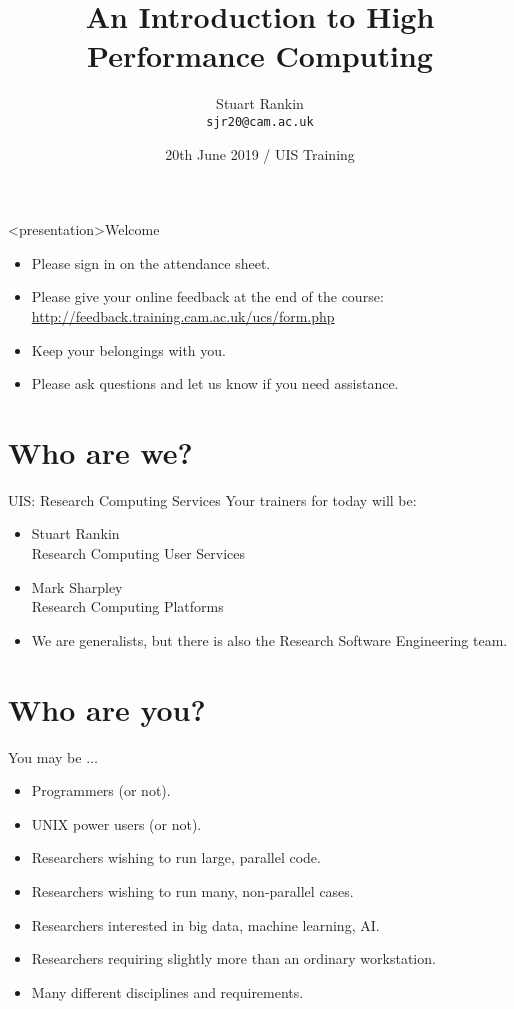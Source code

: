 \documentclass[handout]{beamer}
\title[HPC: An introduction] %
{An Introduction to High Performance Computing}
\author[SJ Rankin] %
{Stuart Rankin\\ \texttt{sjr20@cam.ac.uk}}
\institute[Research Computing Services, University of Cambridge] %
{Research Computing Services (http://www.hpc.cam.ac.uk/)\\
University Information Services (http://www.uis.cam.ac.uk/)}
\date[20/06/2019] %
{20th June 2019 / UIS Training}
\begin{document}
\begin{frame}
  \titlepage
\end{frame}

\begin{frame}<presentation>{Welcome}
\begin{itemize}
\item{Please sign in on the {\color{red}attendance sheet}.}
\item Please give your {\color{red}online feedback} at the end of the course:
      \url{http://feedback.training.cam.ac.uk/ucs/form.php}
\item{Keep your belongings with you.}
\item\alert{Please ask questions and let us know if you need assistance.}
\end{itemize}
\end{frame}

\section{Who are we?}
\begin{frame}{UIS: Research Computing Services}
Your trainers for today will be:\\
\begin{itemize}
\item{\alert{Stuart Rankin}\\{}\qquad\qquad Research Computing User Services}
\item{\alert{Mark Sharpley}\\{}\qquad\qquad Research Computing Platforms}
\item{We are generalists, but there is also the \alert{Research Software Engineering} team.}
\end{itemize}
\end{frame}

\section{Who are you?}
\begin{frame}{You may be $\ldots$}
  \begin{itemize}
  \item{Programmers (or not).}\pause
  \item{UNIX power users (or not).}\pause
  \item{Researchers wishing to run large, parallel code.}\pause
  \item{Researchers wishing to run many, non-parallel cases.}\pause
  \item{Researchers interested in big data, machine learning, AI.}\pause
  \item{Researchers requiring slightly more than an ordinary workstation.}\pause
  \item{\alert{Many different disciplines and requirements.}}
\end{itemize}
\end{frame}
\end{document}

